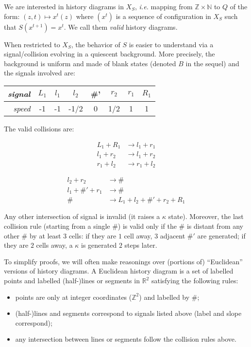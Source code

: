 \documentclass{jac}
\newcommand{\Z}{\mathbb Z}
\newcommand{\N}{\mathbb N}
\theoremstyle{definition}
\begin{document}
We are interested in history diagrams in $X_S$, \textit{i.e.} mapping from
$\Z\times\N$ to $Q$ of the form: ${(z,t)\mapsto x^t(z)}$ where $(x^t)$ is a sequence of configuration in $X_S$
such that $S(x^{t+1})=x^{t}$.  We call them \textit{valid} history diagrams.

When restricted to $X_S$, the behavior of $S$ is easier to understand
via a signal/collision evolving in a quiescent background. More
precisely, the background is uniform and made of blank states (denoted
$B$ in the sequel) and the signals involved are:
\begin{center}
  \begin{tabular}{r|c|c|c|c|c|c|c}
    \textit{signal} &$L_1$ & $l_1$ & $l_2$ & \#' & $r_2$ & $r_1$ & $R_1$\\
    \hline
    \textit{speed} & -1 & -1 & -1/2 & 0 & 1/2 & 1 & 1
  \end{tabular}
\end{center}

The valid collisions are:
\begin{center}
  \begin{minipage}{.48\linewidth}
    \begin{align*}
      L_1+R_1 &\rightarrow l_1 + r_1\\
      l_1 + r_2 &\rightarrow l_1 + r_2\\
      r_1 + l_2 &\rightarrow r_1 + l_2
    \end{align*}
  \end{minipage}
  \begin{minipage}{.48\linewidth}
    \begin{align*}
      l_2+r_2 &\rightarrow \#\\
      l_1+\#'+r_1 &\rightarrow \#\\
      \# &\rightarrow L_1+l_2+\#'+r_2+R_1
    \end{align*}
  \end{minipage}
\end{center}
Any other intersection of signal is invalid (it raises a $\kappa$
state). Moreover, the last collision rule (starting from a single $\#$) is valid
only if the $\#$ is distant from any other $\#$ by at least $3$ cells: if they
are $1$ cell away, $3$ adjacent $\#'$ are generated; if they are $2$ cells away, a
$\kappa$ is generated $2$ steps later.

To simplify proofs, we will often make reasonings over (portions of)
``Euclidean'' versions of history diagrams. A Euclidean history diagram
is a set of labelled points and labelled (half-)lines or segments in
$\mathbb{R}^2$ satisfying the following rules:
\begin{itemize}
\item points are only at integer coordinates ($\Z^2$) and labelled by $\#$;
\item (half-)lines and segments correspond to signals listed above (label and slope correspond);
\item any intersection between lines or segments follow the collision rules above.
\end{itemize}
\end{document}
